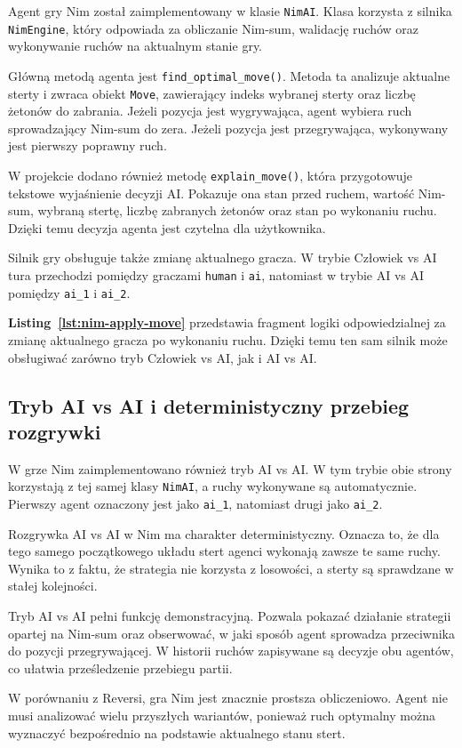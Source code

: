 Agent gry Nim został zaimplementowany w klasie \texttt{NimAI}. Klasa korzysta z silnika \texttt{NimEngine}, który odpowiada za obliczanie Nim-sum, walidację ruchów oraz wykonywanie ruchów na aktualnym stanie gry.

Główną metodą agenta jest \texttt{find\_optimal\_move()}. Metoda ta analizuje aktualne sterty i zwraca obiekt \texttt{Move}, zawierający indeks wybranej sterty oraz liczbę żetonów do zabrania. Jeżeli pozycja jest wygrywająca, agent wybiera ruch sprowadzający Nim-sum do zera. Jeżeli pozycja jest przegrywająca, wykonywany jest pierwszy poprawny ruch.

W projekcie dodano również metodę \texttt{explain\_move()}, która przygotowuje tekstowe wyjaśnienie decyzji AI. Pokazuje ona stan przed ruchem, wartość Nim-sum, wybraną stertę, liczbę zabranych żetonów oraz stan po wykonaniu ruchu. Dzięki temu decyzja agenta jest czytelna dla użytkownika.

Silnik gry obsługuje także zmianę aktualnego gracza. W trybie Człowiek vs AI tura przechodzi pomiędzy graczami \texttt{human} i \texttt{ai}, natomiast w trybie AI vs AI pomiędzy \texttt{ai\_1} i \texttt{ai\_2}.



\textbf{Listing~\ref{lst:nim-apply-move}} przedstawia fragment logiki odpowiedzialnej za zmianę aktualnego gracza po wykonaniu ruchu. Dzięki temu ten sam silnik może obsługiwać zarówno tryb Człowiek vs AI, jak i AI vs AI.

\subsection{Tryb AI vs AI i deterministyczny przebieg rozgrywki}

W grze Nim zaimplementowano również tryb AI vs AI. W tym trybie obie strony korzystają z tej samej klasy \texttt{NimAI}, a ruchy wykonywane są automatycznie. Pierwszy agent oznaczony jest jako \texttt{ai\_1}, natomiast drugi jako \texttt{ai\_2}.

Rozgrywka AI vs AI w Nim ma charakter deterministyczny. Oznacza to, że dla tego samego początkowego układu stert agenci wykonają zawsze te same ruchy. Wynika to z faktu, że strategia nie korzysta z losowości, a sterty są sprawdzane w stałej kolejności.

Tryb AI vs AI pełni funkcję demonstracyjną. Pozwala pokazać działanie strategii opartej na Nim-sum oraz obserwować, w jaki sposób agent sprowadza przeciwnika do pozycji przegrywającej. W historii ruchów zapisywane są decyzje obu agentów, co ułatwia prześledzenie przebiegu partii.

W porównaniu z Reversi, gra Nim jest znacznie prostsza obliczeniowo. Agent nie musi analizować wielu przyszłych wariantów, ponieważ ruch optymalny można wyznaczyć bezpośrednio na podstawie aktualnego stanu stert.
